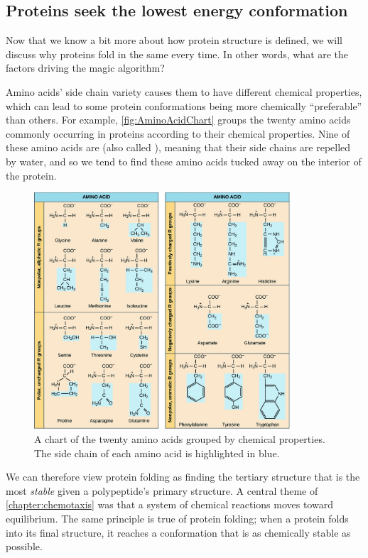\FloatBarrier
\subsection{Proteins seek the lowest energy conformation}

Now that we know a bit more about how protein structure is defined, we will discuss why proteins fold in the same every time. In other words, what are the factors driving the magic algorithm?

Amino acids' side chain variety causes them to have different chemical properties, which can lead to some protein conformations being more chemically ``preferable'' than others. For example, \autoref{fig:AminoAcidChart} groups the twenty amino acids commonly occurring in proteins according to their chemical properties. Nine of these amino acids are  (also called ), meaning that their side chains are repelled by water, and so we tend to find these amino acids tucked away on the interior of the protein.

\begin{figure}[h]
	\centering
	\mySfFamily
	\includegraphics[width = 0.85\textwidth]{../images_CMYK/AminoAcidChart}
	\caption{A chart of the twenty amino acids grouped by chemical properties. The side chain of each amino acid is highlighted in blue.}
	\label{fig:AminoAcidChart}
\end{figure}

We can therefore view protein folding as finding the tertiary structure that is the most \textit{stable} given a polypeptide's primary structure. A central theme of \autoref{chapter:chemotaxis} was that a system of chemical reactions moves toward equilibrium. The same principle is true of protein folding; when a protein folds into its final structure, it reaches a conformation that is as chemically stable as possible.

